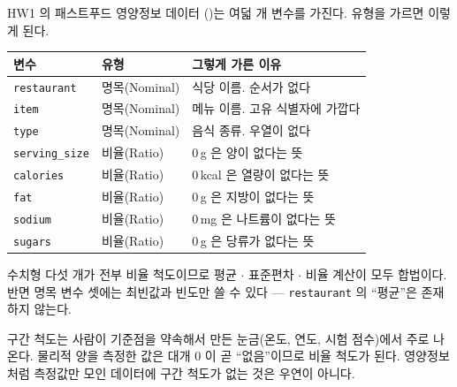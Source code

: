 \begin{example}[과제 데이터의 여덟 변수]
\label{ex:hw1-types}
HW1 의 패스트푸드 영양정보 데이터
()는 여덟 개 변수를 가진다. 유형을 가르면 이렇게 된다.

\begin{center}
\begin{tabularx}{0.95\linewidth}{@{}l l X@{}}
\toprule
변수 & 유형 & 그렇게 가른 이유 \\
\midrule
\texttt{restaurant}   & 명목(Nominal) & 식당 이름. 순서가 없다 \\
\texttt{item}         & 명목(Nominal) & 메뉴 이름. 고유 식별자에 가깝다 \\
\texttt{type}         & 명목(Nominal) & 음식 종류. 우열이 없다 \\
\texttt{serving\_size}& 비율(Ratio)   & 0\,g 은 양이 없다는 뜻 \\
\texttt{calories}     & 비율(Ratio)   & 0\,kcal 은 열량이 없다는 뜻 \\
\texttt{fat}          & 비율(Ratio)   & 0\,g 은 지방이 없다는 뜻 \\
\texttt{sodium}       & 비율(Ratio)   & 0\,mg 은 나트륨이 없다는 뜻 \\
\texttt{sugars}       & 비율(Ratio)   & 0\,g 은 당류가 없다는 뜻 \\
\bottomrule
\end{tabularx}
\end{center}

수치형 다섯 개가 전부 비율 척도이므로 평균 $\cdot$ 표준편차 $\cdot$ 비율 계산이
모두 합법이다. 반면 명목 변수 셋에는 최빈값과 빈도만 쓸 수 있다 ---
\texttt{restaurant} 의 ``평균''은 존재하지 않는다.
\end{example}

\begin{aside}
구간 척도는 사람이 기준점을 약속해서 만든 눈금(온도, 연도, 시험 점수)에서
주로 나온다. 물리적 양을 측정한 값은 대개 0 이 곧 ``없음''이므로 비율 척도가
된다. 영양정보처럼 측정값만 모인 데이터에 구간 척도가 없는 것은 우연이 아니다.
\end{aside}
